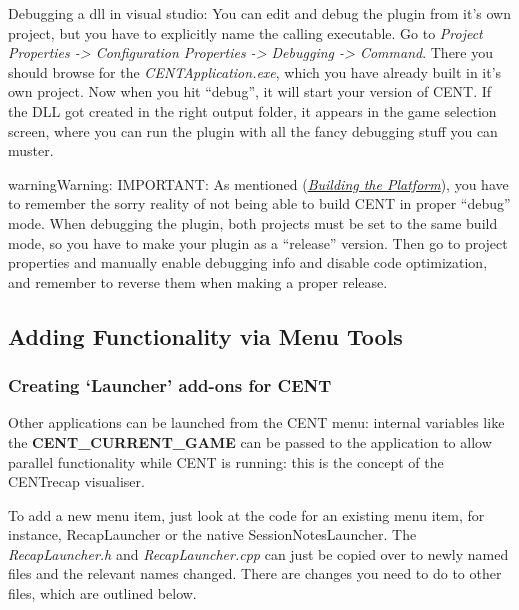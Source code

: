 \documentclass[letterpaper,10pt,english]{sphinxmanual}
\begin{document}
Debugging a dll in visual studio: You can edit and debug the plugin from it's own project, but you have to explicitly name the calling executable. Go to \emph{Project Properties -\textgreater{} Configuration Properties -\textgreater{} Debugging -\textgreater{} Command}. There you should browse for the \emph{CENTApplication.exe}, which you have already built in it's own project. Now when you hit ``debug'', it will start your version of CENT. If the DLL got created in the right output folder, it appears in the game selection screen, where you can run the plugin with all the fancy debugging stuff you can muster.

\begin{notice}{warning}{Warning:}
IMPORTANT: As mentioned ({\hyperref[index:build-plat]{\emph{Building the Platform}}}), you have to remember the sorry reality of not being able to build CENT in proper ``debug'' mode. When debugging the plugin, both projects must be set to the same build mode, so you have to make your plugin as a ``release'' version. Then go to project properties and manually enable debugging info and disable code optimization, and remember to reverse them when making a proper release.
\end{notice}


\subsection{\textbf{Adding Functionality via Menu Tools}}
\label{index:adding-functionality-via-menu-tools}

\subsubsection{Creating `Launcher' add-ons for CENT}
\label{index:creating-launcher-add-ons-for-cent}\label{index:launcher-addon}
Other applications can be launched from the CENT menu: internal variables like the \textbf{CENT\_CURRENT\_GAME} can be passed to the application to allow parallel functionality while CENT is running: this is the concept of the CENTrecap visualiser.

To add a new menu item, just look at the code for an existing menu item, for instance, RecapLauncher or the native SessionNotesLauncher.
The \emph{RecapLauncher.h} and \emph{RecapLauncher.cpp} can just be copied over to newly named files and the relevant names changed. There are changes you need to do to other files, which are outlined below.
\end{document}
